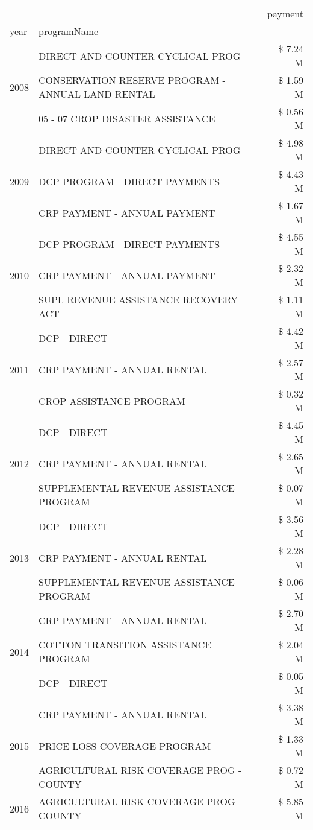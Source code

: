 \begin{tabular}{llr}
\toprule
 &  & payment \\
year & programName &  \\
\midrule
\multirow[t]{3}{*}{2008} & DIRECT AND COUNTER CYCLICAL PROG & \$ 7.24 M \\
 & CONSERVATION RESERVE PROGRAM - ANNUAL LAND RENTAL & \$ 1.59 M \\
 & 05 - 07 CROP DISASTER ASSISTANCE & \$ 0.56 M \\
\cline{1-3}
\multirow[t]{3}{*}{2009} & DIRECT AND COUNTER CYCLICAL PROG & \$ 4.98 M \\
 & DCP PROGRAM - DIRECT PAYMENTS & \$ 4.43 M \\
 & CRP PAYMENT - ANNUAL PAYMENT & \$ 1.67 M \\
\cline{1-3}
\multirow[t]{3}{*}{2010} & DCP PROGRAM - DIRECT PAYMENTS & \$ 4.55 M \\
 & CRP PAYMENT - ANNUAL PAYMENT & \$ 2.32 M \\
 & SUPL REVENUE ASSISTANCE RECOVERY ACT & \$ 1.11 M \\
\cline{1-3}
\multirow[t]{3}{*}{2011} & DCP - DIRECT & \$ 4.42 M \\
 & CRP PAYMENT - ANNUAL RENTAL & \$ 2.57 M \\
 & CROP ASSISTANCE PROGRAM & \$ 0.32 M \\
\cline{1-3}
\multirow[t]{3}{*}{2012} & DCP - DIRECT & \$ 4.45 M \\
 & CRP PAYMENT - ANNUAL RENTAL & \$ 2.65 M \\
 & SUPPLEMENTAL REVENUE ASSISTANCE PROGRAM & \$ 0.07 M \\
\cline{1-3}
\multirow[t]{3}{*}{2013} & DCP - DIRECT & \$ 3.56 M \\
 & CRP PAYMENT - ANNUAL RENTAL & \$ 2.28 M \\
 & SUPPLEMENTAL REVENUE ASSISTANCE PROGRAM & \$ 0.06 M \\
\cline{1-3}
\multirow[t]{3}{*}{2014} & CRP PAYMENT - ANNUAL RENTAL & \$ 2.70 M \\
 & COTTON TRANSITION ASSISTANCE PROGRAM & \$ 2.04 M \\
 & DCP - DIRECT & \$ 0.05 M \\
\cline{1-3}
\multirow[t]{3}{*}{2015} & CRP PAYMENT - ANNUAL RENTAL & \$ 3.38 M \\
 & PRICE LOSS COVERAGE PROGRAM & \$ 1.33 M \\
 & AGRICULTURAL RISK COVERAGE PROG - COUNTY & \$ 0.72 M \\
\cline{1-3}
\multirow[t]{3}{*}{2016} & AGRICULTURAL RISK COVERAGE PROG - COUNTY & \$ 5.85 M \\

\end{tabular}
